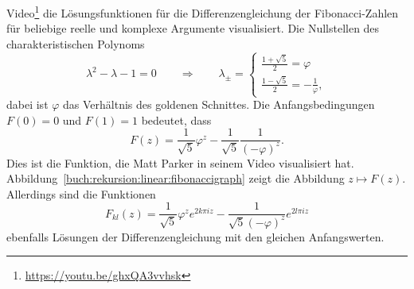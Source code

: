 %
%
%
Video\footnote{\url{https://youtu.be/ghxQA3vvhsk}} die Lösungsfunktionen
für die Differenzengleichung der Fibonacci-Zahlen für beliebige
reelle und komplexe Argumente visualisiert.
Die Nullstellen des charakteristischen Polynoms
\[
\lambda^2-\lambda-1=0
\qquad
\Rightarrow
\qquad
\lambda_\pm = \begin{cases}
\displaystyle
\frac{1+\sqrt{5}}{2}=\varphi
\\[8pt]
\displaystyle
\frac{1-\sqrt{5}}{2}=-\frac{1}{\varphi},
\end{cases}
\]
dabei ist $\varphi$ das Verhältnis des goldenen Schnittes.
%
%
Die Anfangsbedingungen $F(0)=0$ und $F(1)=1$ bedeutet, dass
\begin{equation}
F(z) = \frac{1}{\sqrt{5}}\varphi^z - \frac{1}{\sqrt{5}}\frac{1}{(-\varphi)^z}.
\label{buch:rekursion:linear:fibonaccifunktion}
\end{equation}
Dies ist die Funktion, die Matt Parker in seinem Video visualisiert hat.
Abbildung~\eqref{buch:rekursion:linear:fibonaccigraph} zeigt die Abbildung
$z\mapsto F(z)$.
Allerdings sind die Funktionen
\[
F_{kl}(z)
=
\frac{1}{\sqrt{5}}
\varphi^ze^{2k\pi iz}
-
\frac{1}{\sqrt{5}(-\varphi)^z} e^{2l\pi iz}
\]
ebenfalls Lösungen der Differenzengleichung mit den gleichen 
Anfangswerten.



